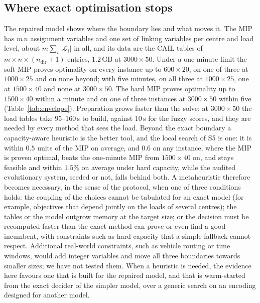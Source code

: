 \documentclass[systems,article,submit,moreauthors,pdftex]{Definitions/mdpi}
\begin{document}
\subsection{Where exact optimisation stops}\label{sec:boundary}
The repaired model shows where the boundary lies and what moves it. The MIP has
$m\,n$ assignment variables and one set of linking variables per centre and load level, about
$m \sum_i |\mathcal{L}_i|$ in all, and its data are the CAIL tables of
$m \times n \times (n_{\mathrm{dir}}+1)$ entries, $1.2$\,GB at $3000 \times 50$. Under a
one-minute limit the soft MIP proves optimality on every instance up to $600 \times 20$, on one of
three at $1000 \times 25$ and on none beyond; with five minutes, on all three at $1000 \times 25$,
one at $1500 \times 40$ and none at $3000 \times 50$. The hard MIP proves optimality up to
$1500 \times 40$ within a minute and on one of three instances at $3000 \times 50$ within five
(Table~\ref{tab:envelope}). Preparation grows faster than the solve: at $3000 \times 50$ the
load tables take $95$--$160$\,s to build, against $10$\,s for the fuzzy scores, and they are needed
by every method that sees the load. Beyond the exact boundary a capacity-aware heuristic is the
better tool, and the local search of S5 is one: it is within $0.5$ units of the MIP on average,
and $0.6$ on any instance, where the MIP is proven optimal, beats the one-minute MIP from
$1500 \times 40$ on, and stays feasible and within $1.5\%$ on average under hard capacity, while the audited evolutionary system, seeded or not, falls
behind both. A metaheuristic therefore becomes necessary, in the sense of the protocol, when one
of three conditions holds: the coupling of the choices cannot be tabulated for an exact model (for
example, objectives that depend jointly on the loads of several centres); the tables or the model
outgrow memory at the target size; or the decision must be recomputed faster than the exact method
can prove or even find a good incumbent, with constraints such as hard capacity that a simple
fallback cannot respect. Additional real-world constraints, such as vehicle routing or time
windows, would add integer variables and move all three boundaries towards smaller sizes; we have not tested them. When a heuristic is needed, the evidence here favours one that is built
for the repaired model, and that is warm-started from the exact decider of the simpler model, over
a generic search on an encoding designed for another model.
\end{document}
